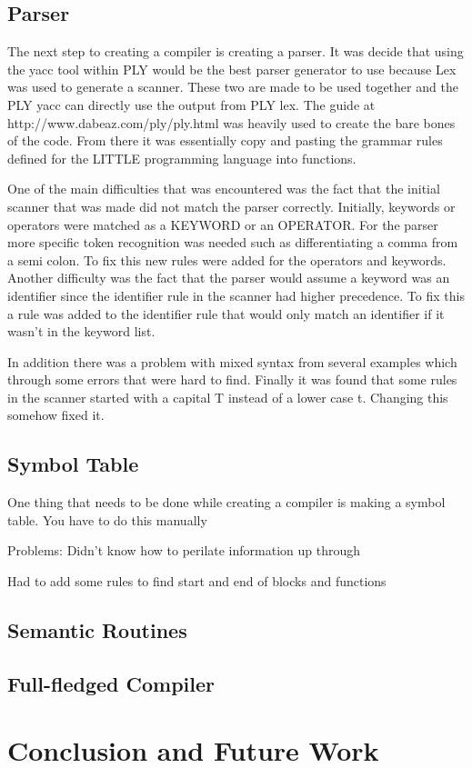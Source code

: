 \documentclass[12pt, oneside]{article}   	%
\begin{document}
	
\subsection{Parser}
The next step to creating a compiler is creating a parser. It was decide that using the yacc
tool within PLY would be the best parser generator to use because Lex was used to generate a
scanner. These two are made to be used together and the PLY yacc can directly use the output
from PLY lex. The guide at http://www.dabeaz.com/ply/ply.html was heavily used to create the
bare bones of the code. From there it was essentially copy and pasting the grammar rules defined
for the LITTLE programming language into functions.

One of the main difficulties that was encountered was the fact that the initial scanner that was
made did not match the parser correctly. Initially, keywords or operators were matched as a
KEYWORD or an OPERATOR. For the parser more specific token recognition was needed such
as differentiating a comma from a semi colon. To fix this new rules were added for the operators
and keywords. Another difficulty was the fact that the parser would assume a keyword was an
identifier since the identifier rule in the scanner had higher precedence. To fix this a rule was
added to the identifier rule that would only match an identifier if it wasn't in the keyword list.

In addition there was a problem with mixed syntax from several examples which through some
errors that were hard to find. Finally it was found that some rules in the scanner started with a
capital T instead of a lower case t. Changing this somehow fixed it.
\subsection{Symbol Table}
One thing that needs to be done while creating a compiler is making a symbol table. You have to do this manually

Problems: Didn't know how to perilate information up through

Had to add some rules to find start and end of blocks and functions

\subsection{Semantic Routines}
\subsection{Full-fledged Compiler}

\section{Conclusion and Future Work}

\end{document}
